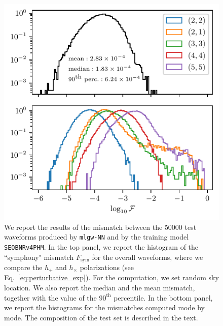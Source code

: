 \documentclass[twocolumn,showpacs,preprintnumbers,nofootinbib,prd,
superscriptaddress,10pt]{revtex4-1}
\begin{document}
\begin{figure}[t]
	\centering
	\includegraphics[scale = 1]{accuracy}
	\caption{We report the results of the mismatch between the $50000$ test waveforms produced by \texttt{mlgw-NN} and by the training model \texttt{SEOBNRv4PHM}.
	In the top panel, we report the histogram of the ``symphony" mismatch $F_\text{sym}$ for the overall waveforms, where we compare the $h_+$ and $h_\times$ polarizations (see Eq.~\eqref{eq:perturbative_exp}). For the computation, we set random sky location. We also report the median and the mean mismatch, together with the value of the $90^\text{th}$ percentile.
	In the bottom panel, we report the histograms for the mismatches computed mode by mode.
	The composition of the test set is described in the text.
	}
	\label{fig:accuracy_hist}
\end{figure}
\end{document}
